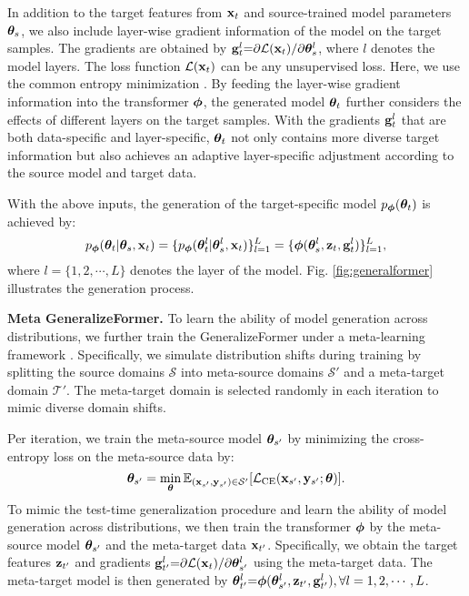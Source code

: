 In addition to the target features from $\mathbf{x}_t$ and source-trained model parameters $\boldsymbol{\theta}_s$, we also include layer-wise gradient information of the model on the target samples. 
The gradients are obtained by $\mathbf{g}_t^l {=} {\partial \mathcal{L} (\mathbf{x}_t)} / {\partial \boldsymbol{\theta}^l_s}$, where $l$ denotes the model layers. The loss function $\mathcal{L} (\mathbf{x}_t)$ can be any unsupervised loss. Here, we use the common 
entropy minimization \cite{wang2021tent, zhang2021memo}.
By feeding the layer-wise gradient information into the transformer $\boldsymbol{\phi}$, the generated model $\boldsymbol{\theta}_t$ further considers the effects of different layers on the target samples. With the gradients $\mathbf{g}_t^l$ that are both data-specific and layer-specific, $\boldsymbol{\theta}_t$ not only contains more diverse target information but also achieves an adaptive layer-specific adjustment according to the source model and target data.

With the above inputs, the generation of the target-specific model $p_{\boldsymbol{\phi}} (\boldsymbol{\theta}_t)$ is achieved by:
\begin{equation}
p_{\boldsymbol{\phi}} (\boldsymbol{\theta}_t | \boldsymbol{\theta}_s, \mathbf{x}_t) = \{ p_{\boldsymbol{\phi}} (\boldsymbol{\theta}_t^l | \boldsymbol{\theta}_s^l, \mathbf{x}_t) \}_{l=1}^L = \{ \boldsymbol{\phi} (\boldsymbol{\theta}^l_s, \mathbf{z}_t, \mathbf{g}^l_t) \}_{l=1}^L,
\end{equation}
where $l {=} \{ 1, 2, \cdots, L \} $ denotes the layer of the model. Fig. \ref{fig:generalformer} illustrates the generation process.

\noindent
\textbf{Meta GeneralizeFormer.} To learn the ability of model generation across distributions, we further train the GeneralizeFormer under a meta-learning framework \cite{du2020learning, xiao2022learning}.
Specifically, we simulate distribution shifts during training by splitting the source domains $\mathcal{S}$ into meta-source domains $\mathcal{S}'$ and a meta-target domain $\mathcal{T}'$. The meta-target domain is selected randomly in each iteration to mimic diverse domain shifts. 

Per iteration, we train the meta-source model $\boldsymbol{\theta}_{s'}$ by minimizing the cross-entropy loss on the meta-source data by:
\begin{equation}
\label{metasource}
   \boldsymbol{\theta}_{s'} = \mathop{\min}\limits_{\boldsymbol{\theta}} \mathbb{E}_{(\mathbf{x}_{s'}, \mathbf{y}_{s'}) \in \mathcal{S}'} [\mathcal{L}_{\mathrm{CE}}(\mathbf{x}_{s'}, \mathbf{y}_{s'}; \boldsymbol{\theta})]. 
\end{equation}
To mimic the test-time generalization procedure and learn the ability of model generation across distributions, we then train the transformer $\boldsymbol{\phi}$ by the meta-source model $\boldsymbol{\theta}_{s'}$ and the meta-target data $\mathbf{x}_{t'}$. Specifically, we obtain the target features $\mathbf{z}_{t'}$ and gradients $\mathbf{g}_{t'}^l{=}{\partial \mathcal{L} (\mathbf{x}_t)} / {\partial \boldsymbol{\theta}_{s'}^l}$ using the meta-target data. The meta-target model is then generated by $\boldsymbol{\theta}^l_{t'} {=} \boldsymbol{\phi}(\boldsymbol{\theta}^l_{s'}, \mathbf{z}_{t'}, \mathbf{g}_{t'}^l), \forall l=1,2,\cdots, L$. 

